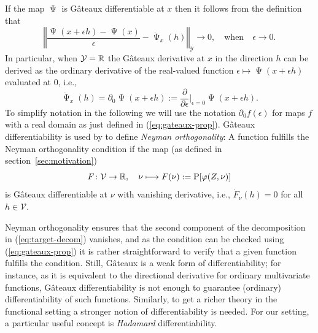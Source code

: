 \documentclass[a4,danish]{article}
\DeclareMathOperator{\TT}{\Psi}
\begin{document}
If the map $\TT$ is Gâteaux differentiable at $x$ then it follows from the definition that
\begin{equation}
  \label{eq:1}
    \left\Vert
      \frac{\TT(x + \epsilon h) - \TT(x)}{\epsilon} - \dot{\TT}_x(h)
    \right\Vert_{\mathcal{Y}} \longrightarrow 0,
    \quad \text{when} \quad \epsilon \longrightarrow 0.
\end{equation}
In particular, when $\mathcal{Y} = \mathbb{R}$ the Gâteaux derivative at $x$ in the direction $h$ can be
derived as the ordinary derivative of the real-valued function
$\epsilon \mapsto \TT(x + \epsilon h)$ evaluated at 0, i.e.,
\begin{equation}
  \label{eq:gateaux-prop}
  \dot{\TT}_x(h) = \partial_0 \TT(x + \epsilon h)
  := \frac{\partial}{\partial \epsilon} \bigg \vert_{\epsilon=0} \TT(x + \epsilon h).
\end{equation}
To simplify notation in the following we will use the notation $\partial_0f(\epsilon)$ for maps $f$
with a real domain as just defined in (\ref{eq:gateaux-prop}). Gâteaux differentiability is used by
\cite{chernozhukov2018double} to define \textit{Neyman orthogonality}: A function 
fulfills the Neyman orthogonality condition  if the map
(as defined in section~\ref{sec:motivation})
\begin{equation*}
  F \colon \mathcal{V} \rightarrow \mathbb{R}, \quad \nu \longmapsto F(\nu) :=\mathrm{{P}}[\varphi(Z, \nu)]
\end{equation*}
is Gâteaux differentiable at $\nu$ with vanishing derivative, i.e., $\dot{F}_{\nu}(h) = 0$ for all
$h \in \mathcal{V}$.

Neyman orthogonality ensures that the second component of the decomposition in
(\ref{eq:target-decom}) vanishes, and as the condition can be checked using (\ref{eq:gateaux-prop})
it is rather straightforward to verify that a given function fulfills the condition. Still, Gâteaux
is a weak form of differentiability; for instance, as it is equivalent to the directional derivative
for ordinary multivariate functions, Gâteaux differentiability is not enough to guarantee (ordinary)
differentiability of such functions. Similarly, to get a richer theory in the functional setting a
stronger notion of differentiability is needed. For our setting, a particular useful concept is
\textit{Hadamard} differentiability.
\end{document}

